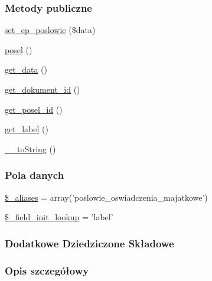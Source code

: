 \subsubsection*{Metody publiczne}
\begin{DoxyCompactItemize}
\item 
\hyperlink{classep___posel___oswiadczenie___majatkowe_a6a354494d54778bcc9254b5826b5f28c}{set\-\_\-ep\-\_\-poslowie} (\$data)
\item 
\hyperlink{classep___posel___oswiadczenie___majatkowe_ad3b9fc55831f7bcabb4870306bc08f4b}{posel} ()
\item 
\hyperlink{classep___posel___oswiadczenie___majatkowe_ab5976d1ba325a739761c2eb6662f58a9}{get\-\_\-data} ()
\item 
\hyperlink{classep___posel___oswiadczenie___majatkowe_adc3366b534d8e1e2570fd6a80624d7ed}{get\-\_\-dokument\-\_\-id} ()
\item 
\hyperlink{classep___posel___oswiadczenie___majatkowe_ae47740401fd789790ece81a1b64abfb2}{get\-\_\-posel\-\_\-id} ()
\item 
\hyperlink{classep___posel___oswiadczenie___majatkowe_abdc537eb3d5a2920cd5d5ea317750660}{get\-\_\-label} ()
\item 
\hyperlink{classep___posel___oswiadczenie___majatkowe_a7516ca30af0db3cdbf9a7739b48ce91d}{\-\_\-\-\_\-to\-String} ()
\end{DoxyCompactItemize}
\subsubsection*{Pola danych}
\begin{DoxyCompactItemize}
\item 
\hyperlink{classep___posel___oswiadczenie___majatkowe_ab4e31d75f0bc5d512456911e5d01366b}{\$\-\_\-aliases} = array('poslowie\-\_\-oswiadczenia\-\_\-majatkowe')
\item 
\hyperlink{classep___posel___oswiadczenie___majatkowe_a4a4d54ae35428077a7c61ec8a5139af3}{\$\-\_\-field\-\_\-init\-\_\-lookup} = 'label'
\end{DoxyCompactItemize}
\subsubsection*{Dodatkowe Dziedziczone Składowe}


\subsubsection{Opis szczegółowy}


